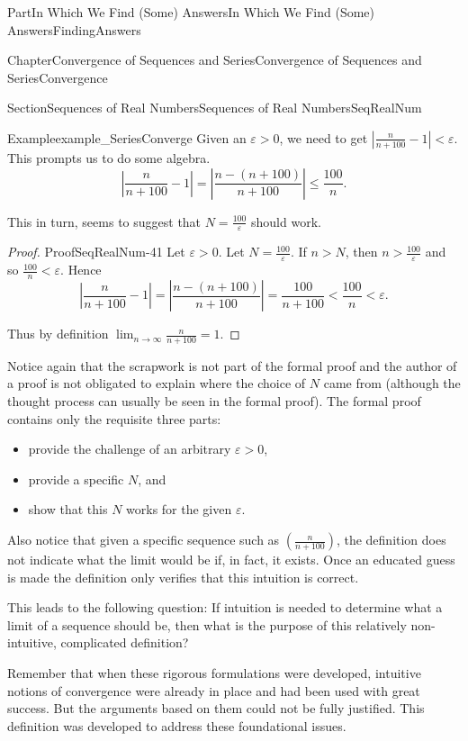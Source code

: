 \documentclass[oneside,10pt,]{book}
\numberwithin{equation}{part}
\newcommand{\abs}[1]{\left|#1\right|}
\def\limitt#1#2#3{{\displaystyle\lim_{#1\rightarrow #2}\textstyle #3}}
\newcommand{\eps}{\varepsilon}
\newcommand{\lt}{<}
\begin{document}
\begin{partptx}{Part}{In Which We Find (Some) Answers}{}{In Which We Find (Some) Answers}{}{}{FindingAnswers}
\begin{chapterptx}{Chapter}{Convergence of Sequences and Series}{}{Convergence of Sequences and Series}{}{}{Convergence}
\begin{sectionptx}{Section}{Sequences of Real Numbers}{}{Sequences of Real Numbers}{}{}{SeqRealNum}
\begin{example}{Example}{}{example_SeriesConverge}
Given an \(\eps>0\), we need to get \(\abs{\frac{n}{n+100}-1}\lt \eps\). This prompts us to do some algebra.%
\begin{equation*}
\left|\frac{n}{n+100}-1\right|=\left|\frac{n-(n+100)}{n+100}\right|\leq\frac{100}{n}\text{.}
\end{equation*}
%
\par
This in turn, seems to suggest that \(N=\frac{100}{\eps}\) should work.%
\end{example}
\begin{proof}{Proof}{}{SeqRealNum-41}
Let \(\eps>0\). Let \(N=\frac{100}{\eps}\). If \(n>N\), then \(n>\frac{100}{\eps}\) and so \(\frac{100}{n}\lt \eps\). Hence%
\begin{equation*}
\left|\frac{n}{n+100}-1\right|=\left|\frac{n-(n+100)}{n+100}\right|= \frac{100}{n+100}\lt \frac{100}{n}\lt \eps\text{.}
\end{equation*}
%
\par
Thus by definition \(\limitt{n}{\infty}{\frac{n}{n+100}} =1\).%
\end{proof}
Notice again that the scrapwork is not part of the formal proof and the author of a proof is not obligated to explain where the choice of \(N\) came from (although the thought process can usually be seen in the formal proof).  The formal proof contains only the requisite three parts:%
\begin{itemize}[label=\textbullet]
\item{}provide the challenge of an arbitrary \(\eps>0\),%
\item{}provide a specific \(N\), and%
\item{}show that this \(N\) works for the given \(\eps\).%
\end{itemize}
%
\par
Also notice that given a specific sequence such as \(\left(\frac{n}{n+100}\right)\), the definition does not indicate what the limit would be if, in fact, it exists.  Once an educated guess is made the definition only verifies that this intuition is correct.%
\par
This leads to the following question: If intuition is needed to determine what a limit of a sequence should be, then what is the purpose of this relatively non-intuitive, complicated definition?%
\par
Remember that when these rigorous formulations were developed, intuitive notions of convergence were already in place and had been used with great success.  But the arguments based on them could not be fully justified. This definition was developed to address these foundational issues.%

\end{sectionptx}
\end{chapterptx}
\end{partptx}
\end{document}
